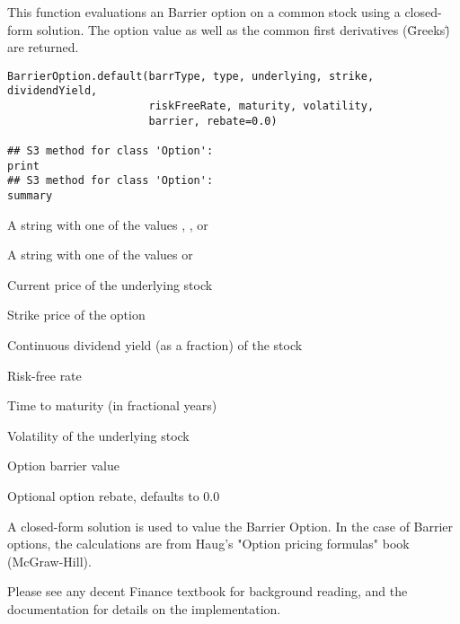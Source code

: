 \begin{Description}\relax
This function evaluations an Barrier option on a common stock
using a closed-form solution. The option value as well as the common first
derivatives (\"Greeks\") are returned.
\end{Description}
\begin{Usage}
\begin{verbatim}
BarrierOption.default(barrType, type, underlying, strike, dividendYield,
                      riskFreeRate, maturity, volatility,
                      barrier, rebate=0.0)

## S3 method for class 'Option':
print
## S3 method for class 'Option':
summary
\end{verbatim}
\end{Usage}
\begin{Arguments}
\begin{ldescription}
\item[\code{barrType}] A string with one of the values ,
,  or 
\item[\code{type}] A string with one of the values  or 
\item[\code{underlying}] Current price of the underlying stock
\item[\code{strike}] Strike price of the option
\item[\code{dividendYield}] Continuous dividend yield (as a fraction) of the stock
\item[\code{riskFreeRate}] Risk-free rate
\item[\code{maturity}] Time to maturity (in fractional years)
\item[\code{volatility}] Volatility of the underlying stock
\item[\code{barrier}] Option barrier value
\item[\code{rebate}] Optional option rebate, defaults to 0.0
\end{ldescription}
\end{Arguments}
\begin{Details}\relax
A closed-form solution is used to value the Barrier Option. In the
case of Barrier options, the calculations are from Haug's "Option
pricing formulas" book (McGraw-Hill).

Please see any decent Finance textbook for background reading, and
the  documentation for details on the 
implementation.
\end{Details}
